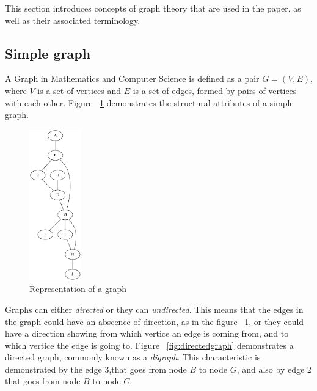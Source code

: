 \label{Graph Overview}


This section introduces concepts of graph theory that are used in the paper, as well as their associated terminology.

\subsection{Simple graph}
A Graph in Mathematics and Computer Science is defined as a pair $G = (V, E)$,  where $V$ is a set of vertices and $E$ is a set of edges, formed by 
pairs of vertices with each other. Figure ~\ref{fig:simplegraph} demonstrates the structural attributes of a simple graph.

\begin{figure}[H]
  \begin{center}
      \includegraphics[width=0.2\textwidth]{simplegraph.png}
  \end{center}    
  \caption{Representation of a graph}
  \label{fig:simplegraph}
\end{figure} 
Graphs can either \textit{directed} or they can \textit{undirected}. This means that the edges in the graph could have an abscence of direction, as in the figure 
~\ref{fig:simplegraph}, or they could have a direction showing from which vertice an edge is coming from, and to which vertice the edge is going to. Figure ~\ref{fig:directedgraph} 
demonstrates a directed graph, commonly known as a \textit{digraph}. This characteristic is demonstrated by the edge $3$,that goes from node $B$ to node $G$, and also by 
edge 2 that goes from node $B$ to node $C$.

